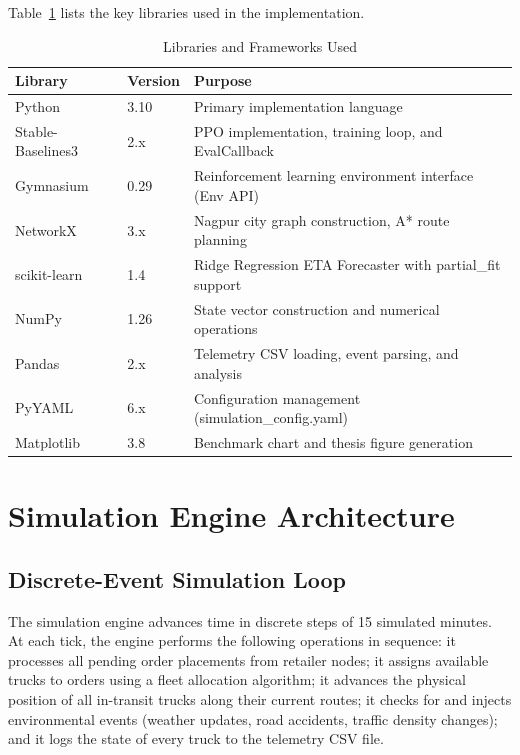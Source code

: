 Table~\ref{tab:libraries} lists the key libraries used in the implementation.

\begin{table}[h!]
\centering
\caption{Libraries and Frameworks Used}
\label{tab:libraries}
\begin{tabular}{|l|l|p{7cm}|}
\hline
\textbf{Library}          & \textbf{Version} & \textbf{Purpose} \\
\hline
Python                    & 3.10             & Primary implementation language \\
\hline
Stable-Baselines3         & 2.x              & PPO implementation, training loop, and EvalCallback \\
\hline
Gymnasium                 & 0.29             & Reinforcement learning environment interface (Env API) \\
\hline
NetworkX                  & 3.x              & Nagpur city graph construction, A* route planning \\
\hline
scikit-learn              & 1.4              & Ridge Regression ETA Forecaster with partial\_fit support \\
\hline
NumPy                     & 1.26             & State vector construction and numerical operations \\
\hline
Pandas                    & 2.x              & Telemetry CSV loading, event parsing, and analysis \\
\hline
PyYAML                    & 6.x              & Configuration management (simulation\_config.yaml) \\
\hline
Matplotlib                & 3.8              & Benchmark chart and thesis figure generation \\
\hline
\end{tabular}
\end{table}

\section{Simulation Engine Architecture}

\subsection{Discrete-Event Simulation Loop}

The simulation engine advances time in discrete steps of 15 simulated minutes.
At each tick, the engine performs the following operations in sequence: it processes
all pending order placements from retailer nodes; it assigns available trucks to
orders using a fleet allocation algorithm; it advances the physical position of all
in-transit trucks along their current routes; it checks for and injects
environmental events (weather updates, road accidents, traffic density changes);
and it logs the state of every truck to the telemetry CSV file.

